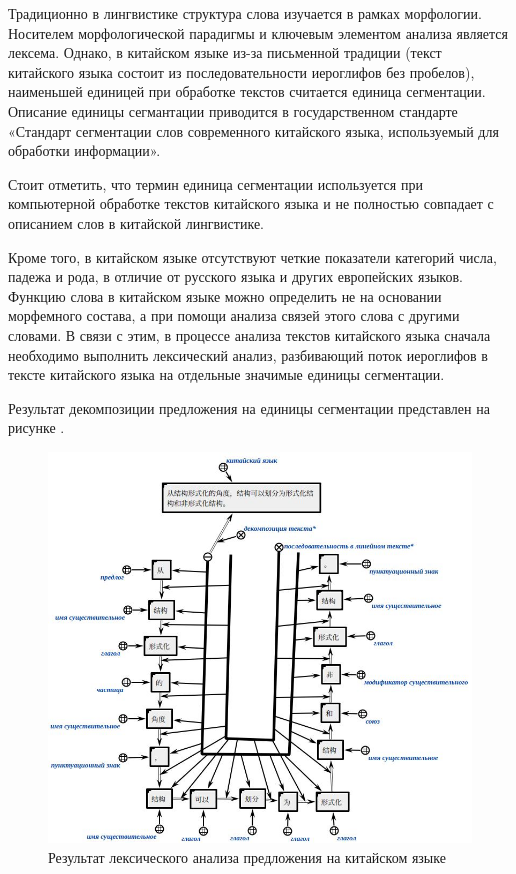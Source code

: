 Традиционно в лингвистике структура слова изучается в рамках морфологии.
Носителем морфологической парадигмы и ключевым элементом анализа является лексема.
Однако, в китайском языке из-за письменной традиции (текст китайского языка состоит из последовательности иероглифов без пробелов), наименьшей единицей при обработке текстов считается единица сегментации. Описание единицы сегмантации приводится в государственном стандарте «Стандарт сегментации слов современного китайского языка, используемый для обработки информации».
\begin{SCn}
\end{SCn}

Стоит отметить, что термин единица сегментации используется при компьютерной обработке текстов китайского языка и не полностью совпадает с описанием слов в китайской лингвистике.

Кроме того, в китайском языке отсутствуют четкие показатели категорий числа, падежа и рода, в отличие от русского языка и других европейских языков. Функцию слова в китайском языке можно определить не на основании морфемного состава, а при помощи анализа связей этого слова с другими словами.
В связи с этим, в процессе анализа текстов китайского языка сначала необходимо выполнить лексический анализ, разбивающий поток иероглифов в тексте китайского языка на отдельные значимые единицы сегментации.

Результат декомпозиции предложения на единицы сегментации представлен на рисунке \textit{}.

\begin{figure}[H]
	\centering
	\includegraphics[scale=0.6]{images/part4/chapter_chinese/segment_chinese_sentence}
	\caption{Результат лексического анализа предложения на китайском языке}
	\label{fig:segment-chinese}
\end{figure}

